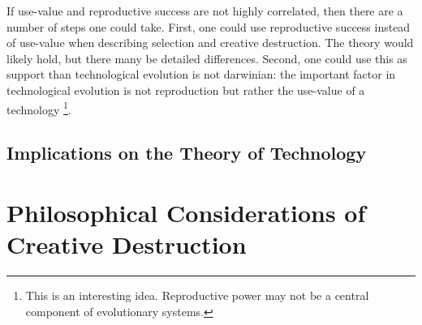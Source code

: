 \documentclass[11pt]{article}
\begin{document}
If use-value and reproductive success are not highly correlated, then there are a number of steps one could take.
First, one could use reproductive success instead of use-value when describing selection and creative destruction. 
The theory would likely hold, but there many be detailed differences. 
Second, one could use this as support than technological evolution is not darwinian: the important factor in technological evolution is not reproduction but rather the use-value of a technology
\footnote{This is an interesting idea. Reproductive power may not be a central component of evolutionary systems.}.


\subsection{Implications on the Theory of Technology}
\section{Philosophical Considerations of Creative Destruction}



\end{document}
